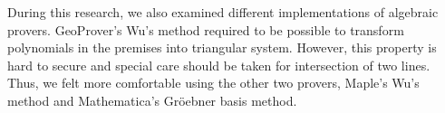 \documentclass[final,1p,times,authoryear]{elsarticle}
\begin{document}
During this research, we also examined different implementations of
algebraic provers. GeoProver's Wu's method required to be possible to
transform polynomials in the premises into triangular system. However,
this property is hard to secure and special care should be taken for
intersection of two lines. Thus, we felt more comfortable using the
other two provers, Maple's Wu's method and Mathematica's Gr\"oebner
basis method.





\end{document}
